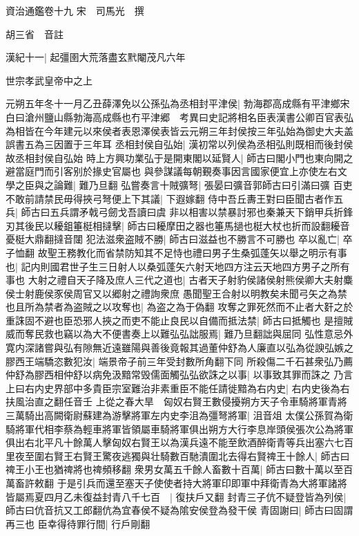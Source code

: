 資治通鑑卷十九
宋　司馬光　撰

胡三省　音註

漢紀十一|{
	起彊圉大荒落盡玄黓閹茂凡六年}


世宗孝武皇帝中之上

元朔五年冬十一月乙丑薛澤免以公孫弘為丞相封平津侯|{
	勃海郡高成縣有平津鄉宋白曰滄州鹽山縣勃海高成縣也冇平津郷　考異曰史記將相名臣表漢書公卿百官表弘為相皆在今年建元以來侯者表恩澤侯表皆云元朔三年封侯按三年弘始為御史大夫盖誤書五為三因置于三年耳}
丞相封侯自弘始|{
	漢初常以列侯為丞相弘則既相而後封侯故丞相封侯自弘始}
時上方興功業弘于是開東閣以延賢人|{
	師古曰閣小門也東向開之避當庭門而引客别於掾史官屬也}
與參謀議每朝覲奏事因言國家便宜上亦使左右文學之臣與之論難|{
	難乃旦翻}
弘嘗奏言十賊彍弩|{
	張晏曰彍音郭師古曰引滿曰彍}
百吏不敢前請禁民毋得挾弓弩便上下其議|{
	下遐嫁翻}
侍中吾丘夀王對曰臣聞古者作五兵|{
	師古曰五兵謂矛戟弓劒戈吾讀曰虞}
非以相害以禁暴討邪也秦兼天下銷甲兵折鋒刃其後民以耰鉏箠梃相撻擊|{
	師古曰耰摩田之器也箠馬撾也梃大杖也折而設翻耰音憂梃大鼎翻撻音闥}
犯法滋衆盗賊不勝|{
	師古曰滋益也不勝言不可勝也}
卒以亂亡|{
	卒子恤翻}
故聖王務教化而省禁防知其不足恃也禮曰男子生桑弧蓬矢以舉之明示有事也|{
	記内則國君世子生三日射人以桑弧蓬矢六射天地四方注云天地四方男子之所有事也}
大射之禮自天子降及庶人三代之道也|{
	古者天子射豹侯諸侯射熊侯卿大夫射麋侯士射鹿侯豕侯周官又以郷射之禮詢衆庶}
愚聞聖王合射以明教矣未聞弓矢之為禁也且所為禁者為盗賊之以攻奪也|{
	為盗之為于偽翻}
攻奪之罪死然而不止者大姧之於重誅固不避也臣恐邪人挾之而吏不能止良民以自備而抵法禁|{
	師古曰抵觸也}
是擅賊威而奪民救也竊以為大不便書奏上以難弘弘詘服焉|{
	難乃旦翻詘與屈同}
弘性意忌外寛内深諸嘗與弘有隙無近遠雖陽與善後竟報其過董仲舒為人廉直以弘為從諛弘嫉之膠西王端驕恣數犯汝|{
	端景帝子前三年受封數所角翻下同}
所殺傷二千石甚衆弘乃薦仲舒為膠西相仲舒以病免汲黯常毁儒面觸弘弘欲誅之以事|{
	以事致其罪而誅之}
乃言上曰右内史界部中多貴臣宗室難治非素重臣不能任請徙黯為右内史|{
	右内史後為右扶風治直之翻任音壬}
上從之春大旱　匈奴右賢王數侵擾朔方天子令車騎將軍青將三萬騎出高闕衛尉蘇建為游擊將軍左内史李沮為彊弩將軍|{
	沮音俎}
太僕公孫賀為衛騎將軍代相李蔡為輕車將軍皆領屬車騎將軍俱出朔方大行李息岸頭侯張次公為將軍俱出右北平凡十餘萬人擊匈奴右賢王以為漢兵遠不能至飲酒醉衛青等兵出塞六七百里夜至圍右賢王右賢王驚夜逃獨與壮騎數百馳潰圍北去得右賢禆王十餘人|{
	師古曰禆王小王也猶禆將也禆頻移翻}
衆男女萬五千餘人畜數十百萬|{
	師古曰數十萬以至百萬畜許敕翻}
于是引兵而還至塞天子使使者持大將軍印即軍中拜衛青為大將軍諸將皆屬焉夏四月乙未復益封青八千七百　|{
	復扶戶又翻}
封青三子伉不疑登皆為列侯|{
	師古曰伉音抗又工郎翻伉為宜春侯不疑為隂安侯登為發干侯}
青固謝曰|{
	師古曰固謂再三也}
臣幸得待罪行間|{
	行戶剛翻}
